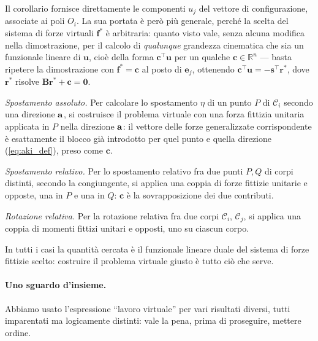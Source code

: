 \begin{oss}
	Il corollario fornisce direttamente le componenti $u_j$
	del vettore di configurazione, associate ai poli $O_i$. La
	sua portata è però più generale, perché la scelta del
	sistema di forze virtuali $\bm f^*$ è arbitraria: quanto
	visto vale, senza alcuna modifica nella dimostrazione, per
	il calcolo di \emph{qualunque} grandezza cinematica che sia
	un funzionale lineare di $\bm u$, cioè della forma
	$\bm c^\top\bm u$ per un qualche $\bm c\in\mathbb R^n$ ---
	basta ripetere la dimostrazione con $\bm f^*=\bm c$ al
	posto di $\bm e_j$, ottenendo
	$\bm c^\top\bm u=-\bm s^\top\bm r^*$, dove $\bm r^*$ risolve
	$\bm B\bm r^*+\bm c=\bm 0$.
	
	\emph{Spostamento assoluto.} Per calcolare lo spostamento
	$\eta$ di un punto $P$ di $\mathcal C_i$ secondo una
	direzione $\mathbf{a}$, si costruisce il problema virtuale con una
	forza fittizia unitaria applicata in $P$ nella direzione
	$\mathbf{a}$: il vettore delle forze generalizzate corrispondente
	è esattamente il blocco già introdotto per quel punto e
	quella direzione (\eqref{eq:aki_def}), preso come $\bm c$.
	
	\emph{Spostamento relativo.} Per lo spostamento relativo fra
	due punti $P,Q$ di corpi distinti, secondo la congiungente,
	si applica una coppia di forze fittizie unitarie e opposte,
	una in $P$ e una in $Q$: $\bm c$ è la sovrapposizione dei
	due contributi.
	
	\emph{Rotazione relativa.} Per la rotazione relativa fra due
	corpi $\mathcal C_i$, $\mathcal C_j$, si applica una coppia
	di momenti fittizi unitari e opposti, uno su ciascun corpo.
	
	In tutti i casi la quantità cercata è il funzionale lineare
	duale del sistema di forze fittizie scelto: costruire il
	problema virtuale giusto è tutto ciò che serve.
\end{oss}



\paragraph{Uno sguardo d'insieme.}
Abbiamo usato l'espressione ``lavoro virtuale'' per vari
risultati diversi, tutti imparentati ma logicamente distinti:
vale la pena, prima di proseguire, mettere ordine.

